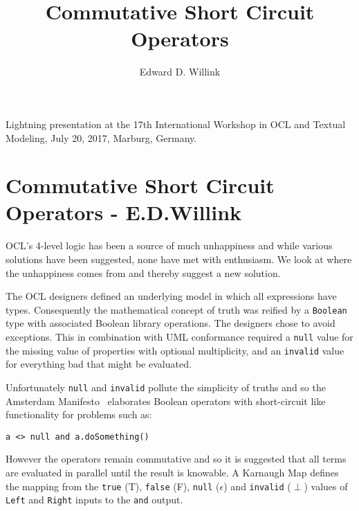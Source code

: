 \documentclass{llncs}
\begin{document}
%
\mainmatter              %
%
\title{Commutative Short Circuit Operators}
%
%
\author{Edward D. Willink}
%
%
%


\maketitle              %
Lightning presentation at the 17th International Workshop in OCL and Textual Modeling, July 20, 2017, Marburg, Germany.
%
\pagebreak
%
\section{Commutative Short Circuit Operators - E.D.Willink}
OCL's 4-level logic has been a source of much unhappiness and while various solutions have been suggested, none have met with enthusiasm. We look at where the unhappiness comes from and thereby suggest a new solution.

The OCL designers defined an underlying model in which all expressions have types. Consequently the mathematical concept of truth was reified by a \texttt{Boolean} type with associated Boolean library operations. The designers chose to avoid exceptions. This in combination with UML conformance required a \texttt{null} value for the missing value of properties with optional multiplicity, and an \texttt{invalid} value for everything bad that might be evaluated. 

Unfortunately \texttt{null} and \texttt{invalid} pollute the simplicity of truths and so the Amsterdam Manifesto~\cite{amsterdam} elaborates Boolean operators with short-circuit like functionality for problems such as: 

\texttt{a <> null and a.doSomething()}

However the operators remain commutative and so it is suggested that all terms are evaluated in parallel until the result is knowable. A Karnaugh Map defines the mapping from the \texttt{true} (T), \texttt{false} (F), \texttt{null} ($\epsilon$) and \texttt{invalid} ($\perp$) values of \texttt{Left} and \texttt{Right} inputs to the \texttt{and} output.
\end{document}

